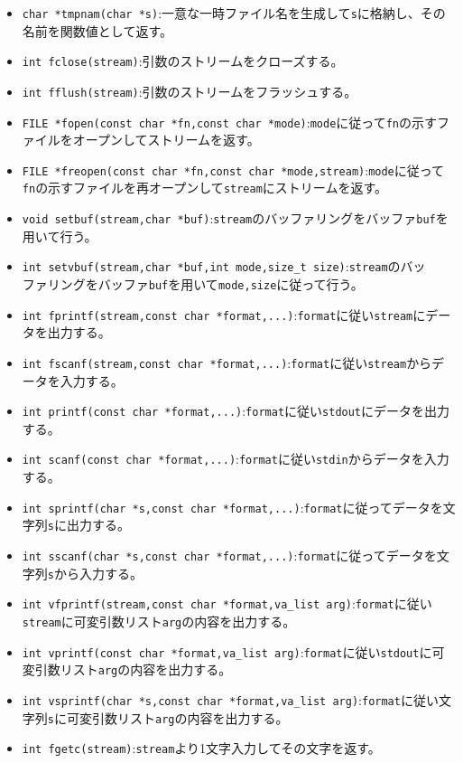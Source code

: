 \begin{itemize}
\item \verb|char *tmpnam(char *s)|:一意な一時ファイル名を生成して\verb|s|に格納し、その名前を関数値として返す。
\item \verb|int fclose(stream)|:引数のストリームをクローズする。
\item \verb|int fflush(stream)|:引数のストリームをフラッシュする。
\item \verb|FILE *fopen(const char *fn,const char *mode)|:\verb|mode|に従って\verb|fn|の示すファイルをオープンしてストリームを返す。
\item \verb|FILE *freopen(const char *fn,const char *mode,stream)|:\verb|mode|に従って\verb|fn|の示すファイルを再オープンして\verb|stream|にストリームを返す。
\item \verb|void setbuf(stream,char *buf)|:\verb|stream|のバッファリングをバッファ\verb|buf|を用いて行う。
\item \verb|int setvbuf(stream,char *buf,int mode,size_t size)|:\verb|stream|のバッ\\ファリングをバッファ\verb|buf|を用いて\verb|mode,size|に従って行う。
\item \verb|int fprintf(stream,const char *format,...)|:\verb|format|に従い\verb|stream|にデータを出力する。
\item \verb|int fscanf(stream,const char *format,...)|:\verb|format|に従い\verb|stream|からデータを入力する。
\item \verb|int printf(const char *format,...)|:\verb|format|に従い\verb|stdout|にデータを出力する。
\item \verb|int scanf(const char *format,...)|:\verb|format|に従い\verb|stdin|からデータを入力する。
\item \verb|int sprintf(char *s,const char *format,...)|:\verb|format|に従ってデータを文字列\verb|s|に出力する。
\item \verb|int sscanf(char *s,const char *format,...)|:\verb|format|に従ってデータを文字列\verb|s|から入力する。
\item \verb|int vfprintf(stream,const char *format,va_list arg)|:\verb|format|に従い\\ \verb|stream|に可変引数リスト\verb|arg|の内容を出力する。
\item \verb|int vprintf(const char *format,va_list arg)|:\verb|format|に従い\verb|stdout|に可変引数リスト\verb|arg|の内容を出力する。
\item \verb|int vsprintf(char *s,const char *format,va_list arg)|:\verb|format|に従い文字列\verb|s|に可変引数リスト\verb|arg|の内容を出力する。
\item \verb|int fgetc(stream)|:\verb|stream|より1文字入力してその文字を返す。

\end{itemize}
